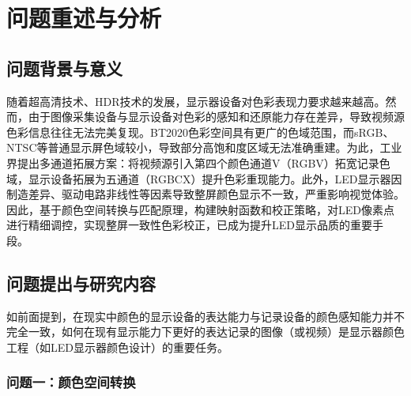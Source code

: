 \chapter[\hspace{0pt}问题重述与分析]{{\heiti{}\hspace{0pt}问题重述与分析}}\label{chapter1: 问题重述与分析}

\removelofgap
\removelotgap

\section[\hspace{-2pt}问题背景与意义]{{\heiti{} \hspace{-8pt}问题背景与意义}}\label{section1: 问题背景与意义}

随着超高清技术、HDR技术的发展，显示器设备对色彩表现力要求越来越高。然而，由于图像采集设备与显示设备对色彩的感知和还原能力存在差异，导致视频源色彩信息往往无法完美复现\cite{poynton2012digital}。BT2020色彩空间\cite{bt2020standard}具有更广的色域范围，而sRGB\cite{srgb1999}、NTSC等普通显示屏色域较小，导致部分高饱和度区域无法准确重建。为此，工业界提出多通道拓展方案：将视频源引入第四个颜色通道V（RGBV）拓宽记录色域，显示设备拓展为五通道（RGBCX）提升色彩重现能力。此外，LED显示器\cite{led_display_tech}因制造差异、驱动电路非线性等因素导致整屏颜色显示不一致，严重影响视觉体验。因此，基于颜色空间转换与匹配原理\cite{fairchild2013color}，构建映射函数和校正策略，对LED像素点进行精细调控，实现整屏一致性色彩校正，已成为提升LED显示品质的重要手段。

\section[\hspace{-2pt}问题提出与研究内容]{{\heiti{} \hspace{-8pt}问题提出与研究内容}}\label{section1: 问题提出与研究内容}

如前面提到，在现实中颜色的显示设备的表达能力与记录设备的颜色感知能力并不完全一致，如何在现有显示能力下更好的表达记录的图像（或视频）是显示器颜色工程（如LED显示器颜色设计）的重要任务。

\subsection[\hspace{-2pt}问题一：颜色空间转换]{{\heiti{} \hspace{-8pt}问题一：颜色空间转换}}\label{subsection1: 问题一}

